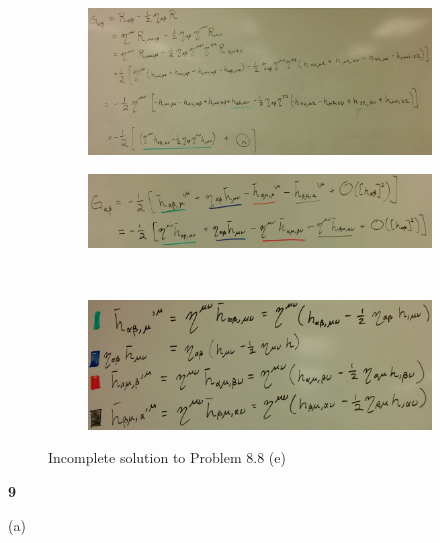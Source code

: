 \documentclass[gr-notes.tex]{subfiles}
\begin{document}
\begin{figure}[ht]
  \centering
  \begin{subfigure}[b]{0.8\textwidth}
    \includegraphics[width=\textwidth]{img/ch8_problem_8e_part3}
    \caption{}
    \label{fig:ch8-problem8e-i}
  \end{subfigure}

  \begin{subfigure}[b]{0.5\textwidth}
    \includegraphics[width=\textwidth]{img/ch8_problem_8e_part1}
    \caption{}
    \label{fig:ch8-problem8e-ii}
  \end{subfigure}
  ~
  \begin{subfigure}[b]{0.3\textwidth}
    \includegraphics[width=\textwidth]{img/ch8_problem_8e_part2}
    \caption{}
    \label{fig:ch8-problem8e-iii}
  \end{subfigure}
  \caption{Incomplete solution to Problem 8.8 (e)}
\end{figure}


\textbf{9}

(a)
\end{document}
